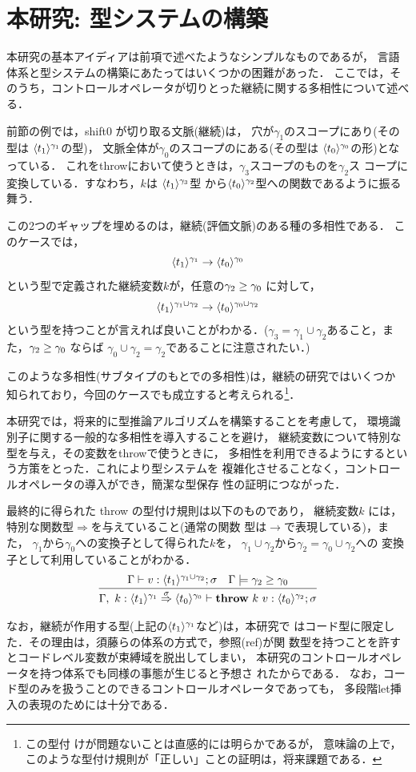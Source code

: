 \section{本研究: 型システムの構築}

本研究の基本アイディアは前項で述べたようなシンプルなものであるが，
言語体系と型システムの構築にあたってはいくつかの困難があった．
ここでは，そのうち，コントロールオペレータが切りとった継続に関する多相性について述べる．

前節の例では，shift0 が切り取る文脈(継続)は，
穴が$\gamma_1$のスコープにあり(その型は $\langle{t_1}\rangle^{\gamma_1}$の型)，
文脈全体が$\gamma_0$のスコープのにある(その型は
$\langle{t_0}\rangle^{\gamma_0}$の形)となっている．
これをthrowにおいて使うときは，$\gamma_3$スコープのものを$\gamma_2$ス
コープに変換している．すなわち，$k$は $\langle{t_1}\rangle^{\gamma_3}$型
から$\langle{t_0}\rangle^{\gamma_2}$型への関数であるように振る舞う．

この2つのギャップを埋めるのは，継続(評価文脈)のある種の多相性である．
このケースでは，
\[\langle{t_1}\rangle^{\gamma_1} \to \langle{t_0}\rangle^{\gamma_0} \]
という型で定義された継続変数$k$が，任意の$\gamma_2 \ge \gamma_0$ に対して，
\[\langle{t_1}\rangle^{\gamma_1 \cup \gamma_2} \to \langle{t_0}\rangle^{\gamma_0 \cup \gamma_2} \]
という型を持つことが言えれば良いことがわかる．($\gamma_3 = \gamma_1
\cup \gamma_2$あること，また，$\gamma_2 \ge \gamma_0$ ならば
$\gamma_0 \cup \gamma_2 = \gamma_2$であることに注意されたい．)

このような多相性(サブタイプのもとでの多相性)は，継続の研究ではいくつか
知られており，今回のケースでも成立すると考えられる\footnote{この型付
  けが問題ないことは直感的には明らかであるが，
  意味論の上で，このような型付け規則が「正しい」ことの証明は，将来課題である．}．

本研究では，将来的に型推論アルゴリズムを構築することを考慮して，
環境識別子に関する一般的な多相性を導入することを避け，
継続変数について特別な型を与え，その変数をthrowで使うときに，
多相性を利用できるようにするという方策をとった．これにより型システムを
複雑化させることなく，コントロールオペレータの導入ができ，簡潔な型保存
性の証明につながった．

最終的に得られた throw の型付け規則は以下のものであり，
継続変数$k$ には，特別な関数型$\Rightarrow$を与えていること(通常の関数
型は$\rightarrow$で表現している)，また，
$\gamma_1$から$\gamma_0$への変換子として得られた$k$を，
$\gamma_1\cup \gamma_2$から$\gamma_2 = \gamma_0 \cup \gamma_2$への
変換子として利用していることがわかる．
\[
  \infer
  {\Gamma,~k:\contT{\codeT{t_1}{\gamma_1}}{\codeT{t_0}{\gamma_0}}{\sigma}
    \vdash \throw{k}{v} : \codeT{t_0}{\gamma_2} ; \sigma}
  {\Gamma
    \vdash v : \codeT{t_1}{\gamma_1 \cup \gamma_2} ; \sigma
    & \Gamma \models \gamma_2 \ord \gamma_0
  }
\]

なお，継続が作用する型(上記の$\langle{t_1}\rangle^{\gamma_1}$など)は，本研究で
はコード型に限定した．その理由は，須藤らの体系の方式で，参照(ref)が関
数型を持つことを許すとコードレベル変数が束縛域を脱出してしまい，
本研究のコントロールオペレータを持つ体系でも同様の事態が生じると予想さ
れたからである．
なお，コード型のみを扱うことのできるコントロールオペレータであっても，
多段階let挿入の表現のためには十分である．

